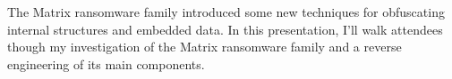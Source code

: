 \def\abstracttitle{Enter The Matrix (Ransomware)}
\def\abstractcomment{Lightning Talk}
\def\abstractowner{Luca Nagy}

\thispagestyle{abstract}

The Matrix ransomware family introduced some new techniques for obfuscating internal structures and embedded data. In this presentation, I'll walk attendees though my investigation of the Matrix ransomware family and a reverse engineering of its main components.\\
